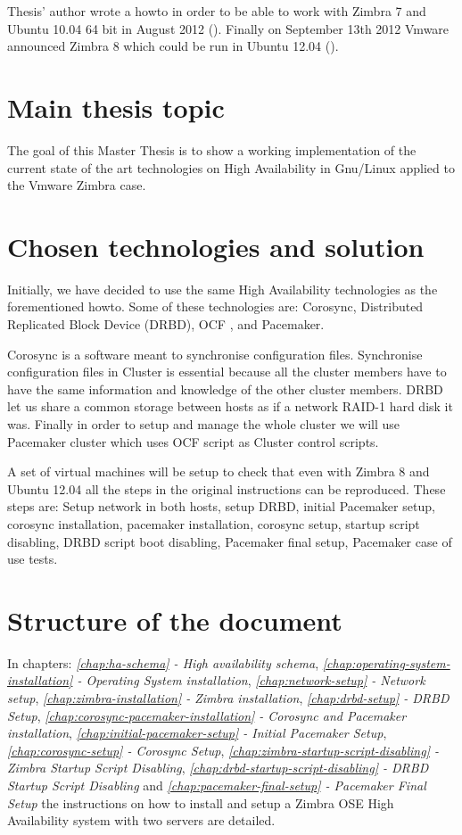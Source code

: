 Thesis' author wrote a howto in order to be able to work with Zimbra 7 and Ubuntu 10.04 64 bit in August 2012 (\cite{BtacticZimbraHAHowto}). Finally on September 13th 2012 Vmware announced Zimbra 8 which could be run in Ubuntu 12.04 (\cite{VmwareZimbra8Announce}).

\section {Main thesis topic}
The goal of this Master Thesis is to show a working implementation of the current state of the art technologies on High Availability in Gnu/Linux applied to the Vmware Zimbra case.

\section {Chosen technologies and solution}
Initially, we have decided to use the same High Availability technologies as the forementioned howto. Some of these technologies are: Corosync, Distributed Replicated Block Device (DRBD), OCF , and Pacemaker.

Corosync is a software meant to synchronise configuration files. Synchronise configuration files in Cluster is essential because all the cluster members have to have the same information and knowledge of the other cluster members. DRBD let us share a common storage between hosts as if a network RAID-1 hard disk it was. Finally in order to setup and manage the whole cluster we will use Pacemaker cluster which uses OCF script as Cluster control scripts.

A set of virtual machines will be setup to check that even with Zimbra 8 and Ubuntu 12.04 all the steps in the original instructions can be reproduced. These steps are: Setup network in both hosts, setup DRBD, initial Pacemaker setup, corosync installation, pacemaker installation, corosync setup, startup script disabling, DRBD script boot disabling, Pacemaker final setup, Pacemaker case of use tests.

\section {Structure of the document}

In chapters: \textit{\ref{chap:ha-schema} - High availability schema},
\textit{\ref{chap:operating-system-installation} - Operating System installation},
\textit{\ref{chap:network-setup} - Network setup},
\textit{\ref{chap:zimbra-installation} - Zimbra installation},
\textit{\ref{chap:drbd-setup} - DRBD Setup},
\textit{\ref{chap:corosync-pacemaker-installation} - Corosync and Pacemaker installation},
\textit{\ref{chap:initial-pacemaker-setup} - Initial Pacemaker Setup},
\textit{\ref{chap:corosync-setup} - Corosync Setup},
\textit{\ref{chap:zimbra-startup-script-disabling} - Zimbra Startup Script Disabling},
\textit{\ref{chap:drbd-startup-script-disabling} - DRBD Startup Script Disabling} and
\textit{\ref{chap:pacemaker-final-setup} - Pacemaker Final Setup} the instructions on how to install and setup a Zimbra OSE High Availability system  with two servers are detailed.

